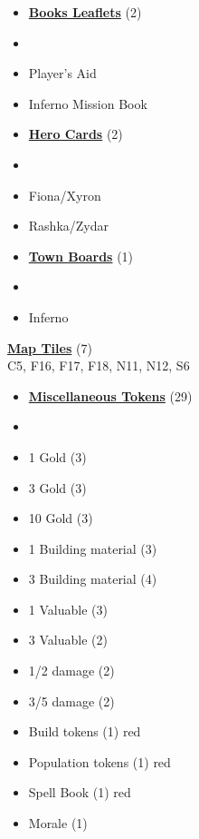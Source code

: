 
\begin{multicols*}{3}

\footnotesize

\begin{itemize}[leftmargin=0pt, label={}, noitemsep, noitemsep]
  \item \textbf{\small{\underline{Books Leaflets}}} (2)
  \item
  \item Player's Aid
  \item Inferno Mission Book
\end{itemize}

\begin{itemize}[leftmargin=0pt, label={}, noitemsep, noitemsep]
  \item \textbf{\small{\underline{Hero Cards}}} (2)
  \item
  \item Fiona/Xyron
  \item Rashka/Zydar
\end{itemize}

\begin{itemize}[leftmargin=0pt, label={}, noitemsep, noitemsep]
  \item \textbf{\small{\underline{Town Boards}}} (1)
  \item
  \item Inferno
\end{itemize}

\textbf{\small{\underline{Map Tiles}}} (7)\\

C5, F16, F17, F18, N11, N12, S6

\begin{itemize}[leftmargin=0pt, label={}, noitemsep, noitemsep]
  \item \textbf{\small{\underline{Miscellaneous Tokens}}} (29)
  \item
  \item 1 Gold (3)
  \item 3 Gold (3)
  \item 10 Gold (3)
  \item 1 Building material (3)
  \item 3 Building material (4)
  \item 1 Valuable (3)
  \item 3 Valuable (2)
  \item 1/2 damage (2)
  \item 3/5 damage (2)
  \item Build tokens (1) {red}
  \item Population tokens (1) {red}
  \item Spell Book (1) {red}
  \item Morale (1)
\end{itemize}


\end{multicols*}
